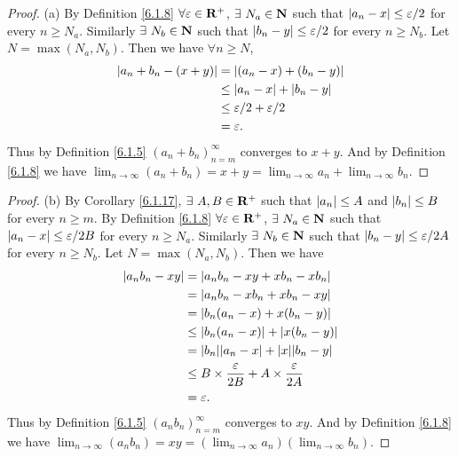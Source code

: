\begin{proof}{(a)}
    By Definition \ref{6.1.8} \(\forall \varepsilon \in \mathbf{R}^+\), \(\exists\ N_a \in \mathbf{N}\) such that \(\left\lvert a_n - x\right\rvert \leq \varepsilon / 2\) for every \(n \geq N_a\).
    Similarly \(\exists\ N_b \in \mathbf{N}\) such that \(\left\lvert b_n - y\right\rvert \leq \varepsilon / 2\) for every \(n \geq N_b\).
    Let \(N = \max(N_a, N_b)\).
    Then we have \(\forall n \geq N\),
    \begin{align*}
        \left\lvert a_n + b_n - (x + y)\right\rvert & = \left\lvert(a_n - x) + (b_n - y)\right\rvert          \\
                                  & \leq \left\lvert a_n - x\right\rvert + \left\lvert b_n - y\right\rvert     \\
                                  & \leq \varepsilon / 2 + \varepsilon / 2 \\
                                  & = \varepsilon.
    \end{align*}
    Thus by Definition \ref{6.1.5} \((a_n + b_n)_{n = m}^\infty\) converges to \(x + y\).
    And by Definition \ref{6.1.8} we have \(\lim_{n \to \infty} (a_n + b_n) = x + y = \lim_{n \to \infty} a_n + \lim_{n \to \infty} b_n\).
\end{proof}

\begin{proof}{(b)}
    By Corollary \ref{6.1.17}, \(\exists\ A, B \in \mathbf{R}^+\) such that \(\left\lvert a_n\right\rvert \leq A\) and \(\left\lvert b_n\right\rvert \leq B\) for every \(n \geq m\).
    By Definition \ref{6.1.8} \(\forall \varepsilon \in \mathbf{R}^+\), \(\exists\ N_a \in \mathbf{N}\) such that \(\left\lvert a_n - x\right\rvert \leq \varepsilon / 2B\) for every \(n \geq N_a\).
    Similarly \(\exists\ N_b \in \mathbf{N}\) such that \(\left\lvert b_n - y\right\rvert \leq \varepsilon / 2A\) for every \(n \geq N_b\).
    Let \(N = \max(N_a, N_b)\).
    Then we have
    \begin{align*}
        \abs{a_n b_n - x y} & = \abs{a_n b_n - x y + x b_n - x b_n}                                  \\
                            & = \abs{a_n b_n - x b_n + x b_n - x y}                                  \\
                            & = \abs{b_n(a_n - x) + x(b_n - y)}                                      \\
                            & \leq \abs{b_n(a_n - x)} + \abs{x(b_n - y)}                             \\
                            & = \abs{b_n}\abs{a_n - x} + \abs{x}\abs{b_n - y}                        \\
                            & \leq B \times \frac{\varepsilon}{2B} + A \times \frac{\varepsilon}{2A} \\
                            & = \varepsilon.
    \end{align*}
    Thus by Definition \ref{6.1.5} \((a_n b_n)_{n = m}^\infty\) converges to \(x y\).
    And by Definition \ref{6.1.8} we have \(\lim_{n \to \infty} (a_n b_n) = x y = (\lim_{n \to \infty} a_n)(\lim_{n \to \infty} b_n)\).
\end{proof}

